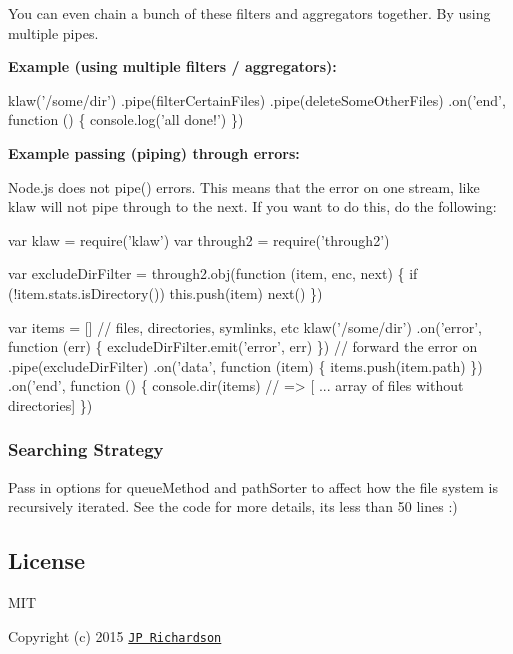 You can even chain a bunch of these filters and aggregators together. By using multiple pipes.

{\bfseries Example (using multiple filters / aggregators)\+:}


\begin{DoxyCode}
klaw('/some/dir')
  .pipe(filterCertainFiles)
  .pipe(deleteSomeOtherFiles)
  .on('end', function () \{
    console.log('all done!')
  \})
\end{DoxyCode}


{\bfseries Example passing (piping) through errors\+:}

Node.\+js does not {\ttfamily pipe()} errors. This means that the error on one stream, like {\ttfamily klaw} will not pipe through to the next. If you want to do this, do the following\+:


\begin{DoxyCode}
var klaw = require('klaw')
var through2 = require('through2')

var excludeDirFilter = through2.obj(function (item, enc, next) \{
  if (!item.stats.isDirectory()) this.push(item)
  next()
\})

var items = [] // files, directories, symlinks, etc
klaw('/some/dir')
  .on('error', function (err) \{ excludeDirFilter.emit('error', err) \}) // forward the error on
  .pipe(excludeDirFilter)
  .on('data', function (item) \{
    items.push(item.path)
  \})
  .on('end', function () \{
    console.dir(items) // => [ ... array of files without directories]
  \})
\end{DoxyCode}


\subsubsection*{Searching Strategy}

Pass in options for {\ttfamily queue\+Method} and {\ttfamily path\+Sorter} to affect how the file system is recursively iterated. See the code for more details, it\textquotesingle{}s less than 50 lines \+:)

\subsection*{License }

M\+IT

Copyright (c) 2015 \href{https://github.com/jprichardson}{\tt JP Richardson} 